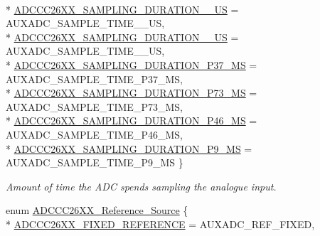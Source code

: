 \begin{DoxyCompactItemize}
\\*
\hyperlink{_a_d_c_c_c26_x_x_8h_adb3cf48cf9cac58a07ade90966bdb8f1a867e94bb4303cf3cd543e3e212e5e45d}{A\+D\+C\+C\+C26\+X\+X\+\_\+\+S\+A\+M\+P\+L\+I\+N\+G\+\_\+\+D\+U\+R\+A\+T\+I\+O\+N\+\_\+\_\+\+U\+S} = A\+U\+X\+A\+D\+C\+\_\+\+S\+A\+M\+P\+L\+E\+\_\+\+T\+I\+M\+E\+\_\+\_\+\+U\+S, 
\\*
\hyperlink{_a_d_c_c_c26_x_x_8h_adb3cf48cf9cac58a07ade90966bdb8f1ab923c950eb31510f3e2bfa377c8b83e9}{A\+D\+C\+C\+C26\+X\+X\+\_\+\+S\+A\+M\+P\+L\+I\+N\+G\+\_\+\+D\+U\+R\+A\+T\+I\+O\+N\+\_\+\_\+\+U\+S} = A\+U\+X\+A\+D\+C\+\_\+\+S\+A\+M\+P\+L\+E\+\_\+\+T\+I\+M\+E\+\_\+\_\+\+U\+S, 
\\*
\hyperlink{_a_d_c_c_c26_x_x_8h_adb3cf48cf9cac58a07ade90966bdb8f1a15f0105a973d2c2c8e0a249909a4396a}{A\+D\+C\+C\+C26\+X\+X\+\_\+\+S\+A\+M\+P\+L\+I\+N\+G\+\_\+\+D\+U\+R\+A\+T\+I\+O\+N\+\_\+P37\+\_\+\+M\+S} = A\+U\+X\+A\+D\+C\+\_\+\+S\+A\+M\+P\+L\+E\+\_\+\+T\+I\+M\+E\+\_\+P37\+\_\+\+M\+S, 
\\*
\hyperlink{_a_d_c_c_c26_x_x_8h_adb3cf48cf9cac58a07ade90966bdb8f1aa9a8a57d24bd02b0fa4cf4073541ade9}{A\+D\+C\+C\+C26\+X\+X\+\_\+\+S\+A\+M\+P\+L\+I\+N\+G\+\_\+\+D\+U\+R\+A\+T\+I\+O\+N\+\_\+P73\+\_\+\+M\+S} = A\+U\+X\+A\+D\+C\+\_\+\+S\+A\+M\+P\+L\+E\+\_\+\+T\+I\+M\+E\+\_\+P73\+\_\+\+M\+S, 
\\*
\hyperlink{_a_d_c_c_c26_x_x_8h_adb3cf48cf9cac58a07ade90966bdb8f1a83687d85af11cd1c395629545c105e19}{A\+D\+C\+C\+C26\+X\+X\+\_\+\+S\+A\+M\+P\+L\+I\+N\+G\+\_\+\+D\+U\+R\+A\+T\+I\+O\+N\+\_\+P46\+\_\+\+M\+S} = A\+U\+X\+A\+D\+C\+\_\+\+S\+A\+M\+P\+L\+E\+\_\+\+T\+I\+M\+E\+\_\+P46\+\_\+\+M\+S, 
\\*
\hyperlink{_a_d_c_c_c26_x_x_8h_adb3cf48cf9cac58a07ade90966bdb8f1aa342c522b5290ad8e8c031ffc5969173}{A\+D\+C\+C\+C26\+X\+X\+\_\+\+S\+A\+M\+P\+L\+I\+N\+G\+\_\+\+D\+U\+R\+A\+T\+I\+O\+N\+\_\+P9\+\_\+\+M\+S} = A\+U\+X\+A\+D\+C\+\_\+\+S\+A\+M\+P\+L\+E\+\_\+\+T\+I\+M\+E\+\_\+P9\+\_\+\+M\+S
 \}
\begin{DoxyCompactList}\small\item\em Amount of time the A\+D\+C spends sampling the analogue input. \end{DoxyCompactList}\item 
enum \hyperlink{_a_d_c_c_c26_x_x_8h_a5ed293d16be70036c4008865dbe33b98}{A\+D\+C\+C\+C26\+X\+X\+\_\+\+Reference\+\_\+\+Source} \{ \\*
\hyperlink{_a_d_c_c_c26_x_x_8h_a5ed293d16be70036c4008865dbe33b98a31a665bebb0b9c1edc53ca94ff5baa56}{A\+D\+C\+C\+C26\+X\+X\+\_\+\+F\+I\+X\+E\+D\+\_\+\+R\+E\+F\+E\+R\+E\+N\+C\+E} = A\+U\+X\+A\+D\+C\+\_\+\+R\+E\+F\+\_\+\+F\+I\+X\+E\+D, 

\end{DoxyCompactItemize}
